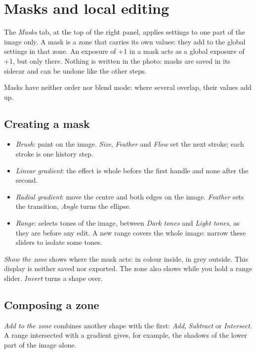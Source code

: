 \chapter{Masks and local editing}
The \emph{Masks} tab, at the top of the right panel, applies settings to one part of the image
only. A mask is a zone that carries its own values: they add to the global settings in that zone.
An exposure of +1 in a mask acts as a global exposure of +1, but only there. Nothing is written in
the photo: masks are saved in its sidecar and can be undone like the other steps.

Masks have neither order nor blend mode: where several overlap, their values add up.

\section{Creating a mask}
\begin{itemize}
\item \emph{Brush}: paint on the image. \emph{Size}, \emph{Feather} and \emph{Flow} set the next
stroke; each stroke is one history step.
\item \emph{Linear gradient}: the effect is whole before the first handle and none after the second.
\item \emph{Radial gradient}: move the centre and both edges on the image. \emph{Feather} sets the
transition, \emph{Angle} turns the ellipse.
\item \emph{Range}: selects tones of the image, between \emph{Dark tones} and \emph{Light tones},
as they are before any edit. A new range covers the whole image: narrow these sliders to isolate
some tones.
\end{itemize}
\emph{Show the zone} shows where the mask acts: in colour inside, in grey outside. This display is
neither saved nor exported. The zone also shows while you hold a range slider.
\emph{Invert} turns a shape over.

\section{Composing a zone}
\emph{Add to the zone} combines another shape with the first: \emph{Add}, \emph{Subtract} or
\emph{Intersect}. A range intersected with a gradient gives, for example, the shadows of the lower
part of the image alone.

